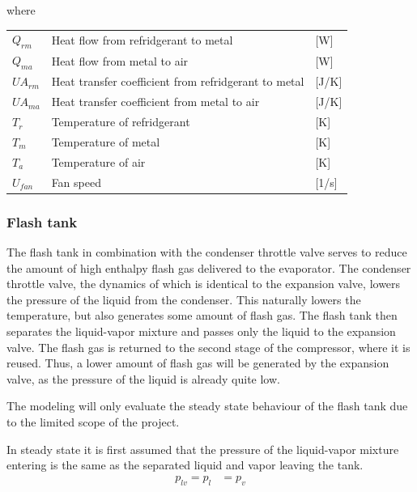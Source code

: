 where

\begin{center}
	\begin{tabular}{l p{8cm} l}
		$Q_{rm}$				&	Heat flow from refridgerant to metal					& [\si{W}] \\
		$Q_{ma}$				&	Heat flow from metal to air								& [\si{W}] \\
		$U A_{rm}$				& 	Heat transfer coefficient from refridgerant to metal 	& [\si{J}/\si{K}] \\
		$U A_{ma}$				& 	Heat transfer coefficient from metal to air				& [\si{J}/\si{K}] \\
		$T_r$					& 	Temperature of refridgerant 							& [\si{K}] \\
		$T_m$					&	Temperature of metal 									& [\si{K}] \\
		$T_a$					&	Temperature of air 										& [\si{K}] \\
		$U_{fan}$				&	Fan speed												& [1/\si{s}] \\
	\end{tabular}
\end{center}



\subsubsection{Flash tank}
The flash tank in combination with the condenser throttle valve serves to reduce the amount of high enthalpy flash gas delivered to the evaporator. The condenser throttle valve, the dynamics of which is identical to the expansion valve, lowers the pressure of the liquid from the condenser. This naturally lowers the temperature, but also generates some amount of flash gas. The flash tank then separates the liquid-vapor mixture and passes only the liquid to the expansion valve. The flash gas is returned to the second stage of the compressor, where it is reused. Thus, a lower amount of flash gas will be generated by the expansion valve, as the pressure of the liquid is already quite low.

The modeling will only evaluate the steady state behaviour of the flash tank due to the limited scope of the project.

In steady state it is first assumed that the pressure of the liquid-vapor mixture entering is the same as the separated liquid and vapor leaving the tank.
\begin{align}
	p_{lv} 	= p_{l}					&  = p_{v}
	\label{eq:Flash_tank_pressure}
\end{align}

